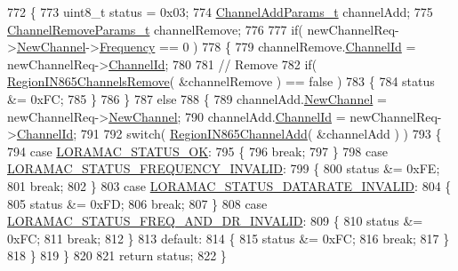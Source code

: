 \begin{DoxyCode}
772 \{
773     uint8\_t status = 0x03;
774     \mbox{\hyperlink{structs_channel_add_params}{ChannelAddParams\_t}} channelAdd;
775     \mbox{\hyperlink{structs_channel_remove_params}{ChannelRemoveParams\_t}} channelRemove;
776 
777     \textcolor{keywordflow}{if}( newChannelReq->\mbox{\hyperlink{structs_new_channel_req_params_afc31493a105479490228fd896b20b45c}{NewChannel}}->\mbox{\hyperlink{structs_channel_params_ade3d190636488dad9a89b19446b7acf1}{Frequency}} == 0 )
778     \{
779         channelRemove.\mbox{\hyperlink{structs_channel_remove_params_ae23f953dc29c360e56a3c856404a3276}{ChannelId}} = newChannelReq->\mbox{\hyperlink{structs_new_channel_req_params_ab072d8ed1ab01d956d5b86a9d0185c3f}{ChannelId}};
780 
781         \textcolor{comment}{// Remove}
782         \textcolor{keywordflow}{if}( \mbox{\hyperlink{group___r_e_g_i_o_n_i_n865_ga06a432cedafb503d6e75757bc7d7e1b0}{RegionIN865ChannelsRemove}}( &channelRemove ) == \textcolor{keyword}{false} )
783         \{
784             status &= 0xFC;
785         \}
786     \}
787     \textcolor{keywordflow}{else}
788     \{
789         channelAdd.\mbox{\hyperlink{structs_channel_add_params_afc31493a105479490228fd896b20b45c}{NewChannel}} = newChannelReq->\mbox{\hyperlink{structs_new_channel_req_params_afc31493a105479490228fd896b20b45c}{NewChannel}};
790         channelAdd.\mbox{\hyperlink{structs_channel_add_params_ae23f953dc29c360e56a3c856404a3276}{ChannelId}} = newChannelReq->\mbox{\hyperlink{structs_new_channel_req_params_ab072d8ed1ab01d956d5b86a9d0185c3f}{ChannelId}};
791 
792         \textcolor{keywordflow}{switch}( \mbox{\hyperlink{group___r_e_g_i_o_n_i_n865_ga409780ea153146450bde780493f00b1b}{RegionIN865ChannelAdd}}( &channelAdd ) )
793         \{
794             \textcolor{keywordflow}{case} \mbox{\hyperlink{group___l_o_r_a_m_a_c_gga1d18f26b344040b3ec5c3db662919661a03db5fca052313edb3823c014b653a74}{LORAMAC\_STATUS\_OK}}:
795             \{
796                 \textcolor{keywordflow}{break};
797             \}
798             \textcolor{keywordflow}{case} \mbox{\hyperlink{group___l_o_r_a_m_a_c_gga1d18f26b344040b3ec5c3db662919661ae3ea7b89796aed5a320013d9743b2955}{LORAMAC\_STATUS\_FREQUENCY\_INVALID}}:
799             \{
800                 status &= 0xFE;
801                 \textcolor{keywordflow}{break};
802             \}
803             \textcolor{keywordflow}{case} \mbox{\hyperlink{group___l_o_r_a_m_a_c_gga1d18f26b344040b3ec5c3db662919661aa910e51ef7a7cf64c27dd3ffe5eb9d38}{LORAMAC\_STATUS\_DATARATE\_INVALID}}:
804             \{
805                 status &= 0xFD;
806                 \textcolor{keywordflow}{break};
807             \}
808             \textcolor{keywordflow}{case} \mbox{\hyperlink{group___l_o_r_a_m_a_c_gga1d18f26b344040b3ec5c3db662919661a163a1a739baee13607068af42f2e9d30}{LORAMAC\_STATUS\_FREQ\_AND\_DR\_INVALID}}:
809             \{
810                 status &= 0xFC;
811                 \textcolor{keywordflow}{break};
812             \}
813             \textcolor{keywordflow}{default}:
814             \{
815                 status &= 0xFC;
816                 \textcolor{keywordflow}{break};
817             \}
818         \}
819     \}
820 
821     \textcolor{keywordflow}{return} status;
822 \}
\end{DoxyCode}
